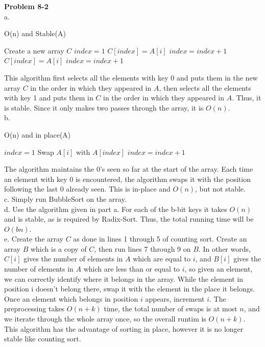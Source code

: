 \documentclass{article}
\begin{document}
\noindent\textbf{Problem 8-2}\\

a. 
\begin{algorithm}
\caption{O(n) and Stable(A)}
\begin{algorithmic}
\State Create a new array $C$
\State $index = 1$
		\State $C[index] = A[i]$
		\State $index = index + 1$
	\EndIf
\EndFor
{}
		\State $C[index] = A[i]$
		\State $index = index + 1$
	\EndIf
\EndFor
\end{algorithmic}
\end{algorithm}
This algorithm first selects all the elements with key 0 and puts them in the new array $C$ in the order in which they appeared in $A$, then selects all the elements with key 1 and puts them in $C$ in the order in which they appeared in $A$.  Thus, it is stable.  Since it only makes two passes through the array, it is $O(n)$. \\

b. 
\begin{algorithm}
\caption{O(n) and in place(A)}
\begin{algorithmic}
\State $index = 1$
		\State Swap $A[i]$ with $A[index]$
		\State $index = index  + 1$
	\EndIf
\EndFor
\end{algorithmic}
\end{algorithm}
The algorithm maintains the 0's seen so far at the start of the array.  Each time an element with key 0 is encountered, the algorithm swaps it with the position following the last 0 already seen.  This is in-place and $O(n)$, but not stable. \\

c.  Simply run BubbleSort on the array. \\

d. Use the algorithm given in part a. For each of the b-bit keys it takes $O(n)$ and is stable, as is required by Radix-Sort. Thus, the total running time will be $O(bn)$. \\

e. Create the array $C$ as done in lines 1 through 5 of counting sort.  Create an array $B$ which is a copy of $C$, then run lines 7 through 9 on $B$.  In other words, $C[i]$ gives the number of elements in $A$ which are equal to $i$, and $B[i]$ gives the number of elements in $A$ which are less than or equal to $i$, so given an element, we can correctly identify where it belongs in the array.  While the element in position i doesn't belong there, swap it with the element in the place it belongs. Once an element which belongs in position $i$ appears, increment $i$. The preprocessing takes $O(n+k)$ time, the total number of swaps is at most $n$, and we iterate through the whole array once, so the overall runtim is $O(n+k)$. This algorithm has the advantage of sorting in place, however it is no longer stable like counting sort. \\
\end{document}
